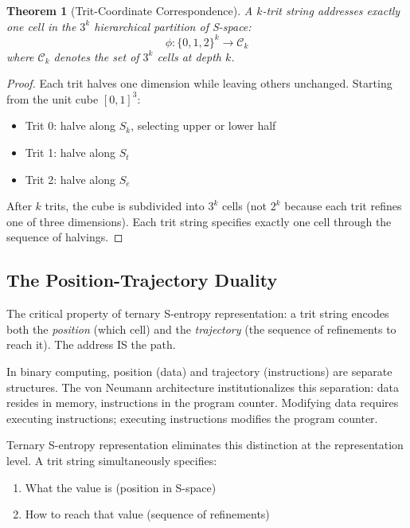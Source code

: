\documentclass[twocolumn,10pt]{article}
\newtheorem{theorem}{Theorem}[section]
\theoremstyle{remark}
\newcommand{\Sk}{S_k}
\newcommand{\St}{S_t}
\newcommand{\Se}{S_e}
\begin{document}
\begin{theorem}[Trit-Coordinate Correspondence]
\label{thm:trit_coord}
A $k$-trit string addresses exactly one cell in the $3^k$ hierarchical partition of S-space:
\begin{equation}
\phi: \{0,1,2\}^k \to \mathcal{C}_k
\end{equation}
where $\mathcal{C}_k$ denotes the set of $3^k$ cells at depth $k$.
\end{theorem}

\begin{proof}
Each trit halves one dimension while leaving others unchanged. Starting from the unit cube $[0,1]^3$:
\begin{itemize}
\item Trit 0: halve along $\Sk$, selecting upper or lower half
\item Trit 1: halve along $\St$
\item Trit 2: halve along $\Se$
\end{itemize}
After $k$ trits, the cube is subdivided into $3^k$ cells (not $2^k$ because each trit refines one of three dimensions). Each trit string specifies exactly one cell through the sequence of halvings.
\end{proof}

\subsection{The Position-Trajectory Duality}

The critical property of ternary S-entropy representation: a trit string encodes both the \textit{position} (which cell) and the \textit{trajectory} (the sequence of refinements to reach it). The address IS the path.

In binary computing, position (data) and trajectory (instructions) are separate structures. The von Neumann architecture institutionalizes this separation: data resides in memory, instructions in the program counter. Modifying data requires executing instructions; executing instructions modifies the program counter.

Ternary S-entropy representation eliminates this distinction at the representation level. A trit string simultaneously specifies:
\begin{enumerate}
\item What the value is (position in S-space)
\item How to reach that value (sequence of refinements)
\end{enumerate}
\end{document}
